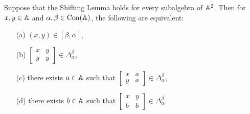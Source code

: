 \documentclass[letterpaper,11pt]{article}
\DeclareMathOperator{\Con}{Con}
\begin{document}
\begin{thm}\label{shifting-commutator} Suppose that the Shifting Lemma holds for every subalgebra of $\mathbb{A}^2$. Then for $x,y \in \mathbb{A}$ and $\alpha,\beta \in \Con(\bA)$, the following are equivalent:
\begin{itemize}
\item[(a)] $(x,y) \in [\beta,\alpha]$,

\item[(b)] $\begin{bmatrix} x & y\\ y & y\end{bmatrix} \in \Delta_\alpha^\beta$,

\item[(c)] there exists $a \in \mathbb{A}$ such that $\begin{bmatrix} x & a\\ y & a\end{bmatrix} \in \Delta_\alpha^\beta$,

\item[(d)] there exists $b \in \mathbb{A}$ such that $\begin{bmatrix} x & y\\ b & b\end{bmatrix} \in \Delta_\alpha^\beta$.
\end{itemize}
\end{thm}
\end{document}

